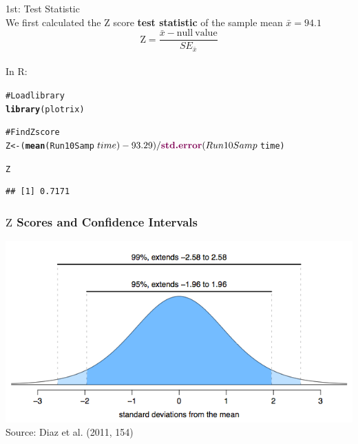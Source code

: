\documentclass{beamer}\usepackage{graphicx, color}
\makeatletter
\newcommand{\hlfunctioncall}[1]{\textcolor[rgb]{0.501960784313725,0,0.329411764705882}{\textbf{#1}}}%
\newcommand{\hlcomment}[1]{\textcolor[rgb]{0.180392156862745,0.6,0.341176470588235}{#1}}%
\newenvironment{kframe}{%
 \def\at@end@of@kframe{}%
 \ifinner\ifhmode%
  \def\at@end@of@kframe{\end{minipage}}%
  \begin{minipage}{\columnwidth}%
 \fi\fi%
 \def\FrameCommand##1{\hskip\@totalleftmargin \hskip-\fboxsep
 \colorbox{shadecolor}{##1}\hskip-\fboxsep
     \hskip-\linewidth \hskip-\@totalleftmargin \hskip\columnwidth}%
 \MakeFramed {\advance\hsize-\width
   \@totalleftmargin\z@ \linewidth\hsize
   \@setminipage}}%
 {\par\unskip\endMakeFramed%
 \at@end@of@kframe}
\newenvironment{knitrout}{}{} %
\makeatother
\begin{document}
\begin{frame}
{\LARGE{1st: Test Statistic}} \\[0.5cm]
  We first calculated the $\mathrm{Z}$ score {\bf{test statistic}} of the sample mean $\bar{x} = 94.1$
\[
  \mathrm{Z} = \frac{\bar{x} - \mathrm{null\:value}}{SE_{\bar{x}}}
\]\\[0.25cm]
In R:
\begin{knitrout}
\color{fgcolor}\begin{kframe}
\begin{alltt}
\hlcomment{# Load library}
\hlfunctioncall{library}(plotrix)

\hlcomment{# Find Z score }
Z <- (\hlfunctioncall{mean}(Run10Samp$time) - 93.29)/
      \hlfunctioncall{std.error}(Run10Samp$time)

Z
\end{alltt}
\begin{verbatim}
## [1] 0.7171
\end{verbatim}
\end{kframe}
\end{knitrout}

\end{frame}

\begin{frame}
  \frametitle{$\mathrm{Z}$ Scores and Confidence Intervals}
  \begin{center}
    \includegraphics[scale=0.45]{figure/ZScore.png} \\
    Source: Diaz et al. (2011, 154)
  \end{center}
\end{frame}
\end{document}
